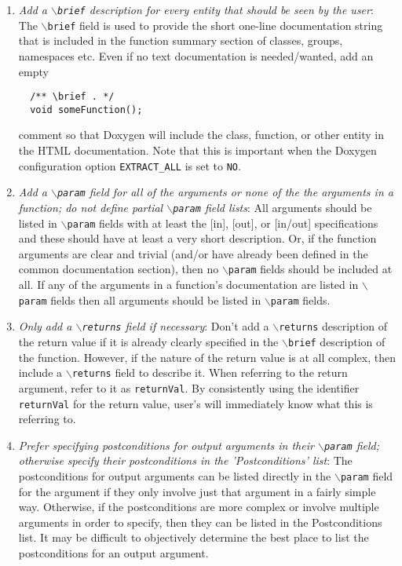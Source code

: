 \begin{enumerate}
{}\item\textit{Add a {}\texttt{$\backslash$brief} description for every entity
that should be seen by the user}: The {}\texttt{$\backslash$brief} field is
used to provide the short one-line documentation string that is included in
the function summary section of classes, groups, namespaces etc.  Even if no
text documentation is needed/wanted, add an empty
%
{\small\begin{verbatim}
  /** \brief . */
  void someFunction();
\end{verbatim}}
%
comment so that Doxygen will include the class, function, or other entity in
the HTML documentation.  Note that this is important when the Doxygen
configuration option {}\texttt{EXTRACT\-\_ALL} is set to {}\texttt{NO}.

{}\item\textit{Add a {}\texttt{$\backslash$param} field for all of the
arguments or none of the the arguments in a function; do not define partial
{}\texttt{$\backslash$param} field lists}: All arguments should be listed in
{}\texttt{$\backslash$param} fields with at least the [in], [out], or [in/out]
specifications and these should have at least a very short description.  Or,
if the function arguments are clear and trivial (and/or have already been
defined in the common documentation section), then no
{}\texttt{$\backslash$param} fields should be included at all.  If any of the
arguments in a function's documentation are listed in
{}\texttt{$\backslash$param} fields then all arguments should be listed in
{}\texttt{$\backslash$param} fields.

{}\item\textit{Only add a {}\texttt{$\backslash$returns} field if necessary}:
Don't add a {}\texttt{$\backslash$returns} description of the return value if
it is already clearly specified in the {}\texttt{$\backslash$brief}
description of the function.  However, if the nature of the return value is at
all complex, then include a {}\texttt{$\backslash$returns} field to describe
it.  When referring to the return argument, refer to it as
{}\texttt{returnVal}.  By consistently using the identifier
{}\texttt{returnVal} for the return value, user's will immediately know what
this is referring to.

{}\item\textit{Prefer specifying postconditions for output arguments in their
{}\texttt{$\backslash$param} field; otherwise specify their postconditions in
the 'Postconditions' list}: The postconditions for output arguments can be
listed directly in the {}\texttt{$\backslash$param} field for the argument if
they only involve just that argument in a fairly simple way.  Otherwise, if
the postconditions are more complex or involve multiple arguments in order to
specify, then they can be listed in the Postconditions list.  It may be
difficult to objectively determine the best place to list the postconditions
for an output argument.


\end{enumerate}
